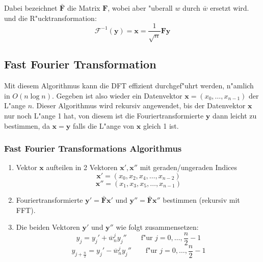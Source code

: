 \documentclass[german, 10pt, a4paper, twocolumn]{scrartcl}
\begin{document}
Dabei bezeichnet $\mathbf{\bar{F}}$ die Matrix $\mathbf{F}$, wobei aber "uberall $w$ durch $\bar{w}$ ersetzt wird.\\

und die R"ucktransformation:
\begin{displaymath}
	\mathcal{F}^{-1}(\mathbf{y})=\mathbf{x}= \frac{1}{\sqrt{n}}\mathbf{F}\mathbf{y}
\end{displaymath}

\subsection{Fast Fourier Transformation}

Mit diesem Algorithmus kann die DFT effizient durchgef"uhrt werden, n"amlich in $O(n\log n)$. Gegeben ist also wieder ein Datenvektor $\mathbf{x}=(x_0,\ldots,x_{n-1})$ der L"ange $n$.
Dieser Algorithmus wird rekursiv angewendet, bis der Datenvektor $\mathbf{x}$ nur noch L"ange 1 hat, von diesem ist die Fouriertransformierte $\mathbf{y}$ dann leicht zu bestimmen, da $\mathbf{x}=\mathbf{y}$ falls die L"ange von $\mathbf{x}$ gleich 1 ist.\\

\subsubsection{Fast Fourier Transformations Algorithmus}

\begin{enumerate}
	\item Vektor $\mathbf{x}$ aufteilen in 2 Vektoren $\mathbf{x}',\mathbf{x}''$ mit geraden/ungeraden Indices
		\begin{displaymath}
			\mathbf{x}' = (x_0, x_2, x_4, \ldots, x_{n-2})
		\end{displaymath}
		\begin{displaymath}
			\mathbf{x}'' = (x_1, x_3, x_5, \ldots, x_{n-1})
		\end{displaymath}
	\item Fouriertransformierte $\mathbf{y}'=\mathbf{\bar{F}}\mathbf{x}'$ und $\mathbf{y}''=\mathbf{\bar{F}}\mathbf{x}''$  bestimmen (rekursiv mit FFT).
	\item Die beiden Vektoren $\mathbf{y}'$ und $\mathbf{y}''$ wie folgt zusammensetzen:
		\begin{displaymath}
			y_j = y_j' + \overline{w}^j_n y_j'' \qquad \mbox{f"ur }j=0,\ldots,\frac{n}{2}-1
		\end{displaymath}
		\begin{displaymath}
			y_{j+\frac{n}{2}} = y_j' - \overline{w}^j_n y_j'' \qquad \mbox{f"ur }j=0,\ldots,\frac{n}{2}-1
		\end{displaymath}
\end{enumerate}
\end{document}
